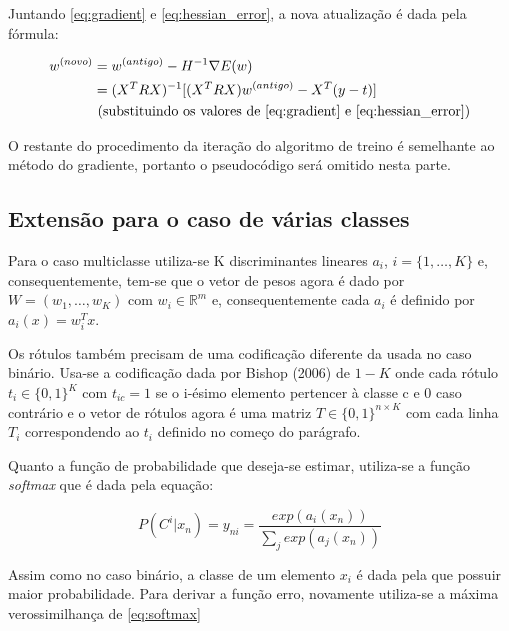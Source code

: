 Juntando \ref{eq:gradient} e \ref{eq:hessian_error}, a nova atualização é dada pela fórmula:

\begin{equation}
	\begin{split}
		w^{ (novo) } & = w^{ (antigo) } - H^{-1} \nabla E(w) \\
		& = (X^T R X)^{-1}[(X^T R X)w^{ (antigo) } - X^T(y - t)] 
		\\		
		&\text{ (substituindo os valores de \ref{eq:gradient} e \ref{eq:hessian_error})} 
	\end{split}
\end{equation}

O restante do procedimento da iteração do algoritmo de treino é semelhante ao método do gradiente,
portanto o pseudocódigo será omitido nesta parte.

\subsection{Extensão para o caso de várias classes}

Para o caso multiclasse utiliza-se K discriminantes lineares $a_i$, $i = \{1, \ldots, K\}$ e,
consequentemente, tem-se que o vetor de pesos agora é dado por $W = (w_1, \ldots, w_K)$ com
$w_i \in \mathbb{R}^m$ e, consequentemente cada $a_i$ é definido por $a_i(x) = w_i^Tx$.

Os rótulos também precisam de uma codificação diferente da usada no caso binário. Usa-se a codificação
dada por Bishop (2006)\cite{bishop2006} de $1-K$ onde cada rótulo $t_i \in \{0, 1\}^K$ com
$t_{ic} = 1$ se o i-ésimo elemento pertencer à classe c e 0 caso contrário e o vetor de rótulos
agora é uma matriz $T \in \{0, 1\}^{n \times K}$ com cada linha $T_i$ correspondendo ao
$t_i$ definido no começo do parágrafo.

Quanto a função de probabilidade que deseja-se estimar, utiliza-se a função
\textit{softmax} que é dada pela equação:

\begin{center}
	\begin{equation}
		\label{eq:softmax}
		P(C^i | x_n) = y_{ni} = \frac{exp(a_i(x_n))}{\sum_j exp(a_j(x_n))} 
	\end{equation}
\end{center}

Assim como no caso binário, a classe de um elemento $x_i$ é dada pela que possuir maior probabilidade.
Para derivar a função erro, novamente utiliza-se a máxima verossimilhança de \ref{eq:softmax}

